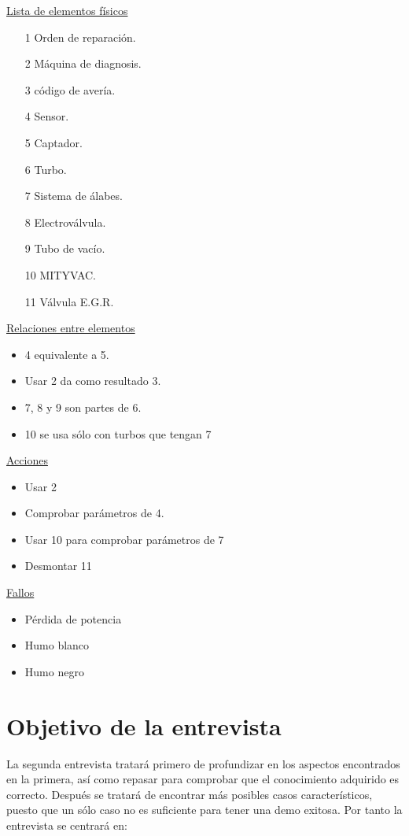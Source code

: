 \documentclass[a4paper,12pt]{article}
\begin{document}
\underline{Lista de elementos físicos}
\begin{itemize}
\item[1] Orden de reparación.
\item[2] Máquina de diagnosis.
\item[3] código de avería.
\item[4] Sensor.
\item[5] Captador.
\item[6] Turbo.
\item[7] Sistema de álabes.
\item[8] Electroválvula.
\item[9] Tubo de vacío.
\item[10] MITYVAC.
\item[11] Válvula E.G.R.
\end{itemize}

\underline{Relaciones entre elementos}
\begin{itemize}
\item 4 equivalente a 5.
\item Usar 2 da como resultado 3.
\item 7, 8 y 9 son partes de 6.
\item 10 se usa sólo con turbos que tengan 7
\end{itemize}

\underline{Acciones}
\begin{itemize}
\item Usar 2
\item Comprobar parámetros de 4.
\item Usar 10 para comprobar parámetros de 7
\item Desmontar 11
\end{itemize}

\underline{Fallos}
\begin{itemize}
\item Pérdida de potencia
\item Humo blanco
\item Humo negro
\end{itemize}
 
\section{Objetivo de la entrevista}
La segunda entrevista tratará primero de profundizar en los aspectos encontrados en la primera, así como repasar para comprobar que el conocimiento adquirido es correcto. Después se tratará de encontrar más posibles casos característicos, puesto que un sólo caso no es suficiente para tener una demo exitosa.
Por tanto la entrevista se centrará en:
\end{document}
